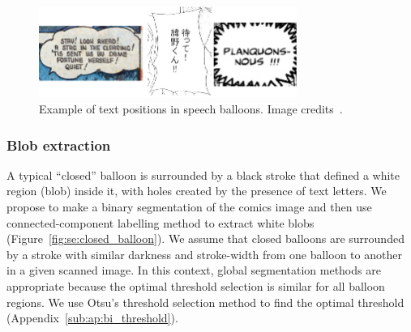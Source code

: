 	\begin{figure}[h!]	%
	  \centering
		\includegraphics[trim= 0px 0px 0px 0px, clip, width=0.75\textwidth]{text_in_balloon.png}
		\caption[Text positions in speech balloons]{Example of text positions in speech balloons. Image credits~\cite{McCall46,Inoue08,Bubble09}.}
		\label{fig:se:text_in_balloon}
	\end{figure}

\subsubsection{Blob extraction} %
\label{par:blob_extraction}

A typical ``closed'' balloon is surrounded by a black stroke that defined a white region (blob) inside it, with holes created by the presence of text letters.
We propose to make a binary segmentation of the comics image and then use connected-component labelling method to extract white blobs (Figure~\ref{fig:se:closed_balloon}).
We assume that closed balloons are surrounded by a stroke with similar darkness and stroke-width from one balloon to another in a given scanned image.
In this context, global segmentation methods are appropriate because the optimal threshold selection is similar for all balloon regions.
We use Otsu's threshold selection method to find the optimal threshold (Appendix~\ref{sub:ap:bi_threshold}).

